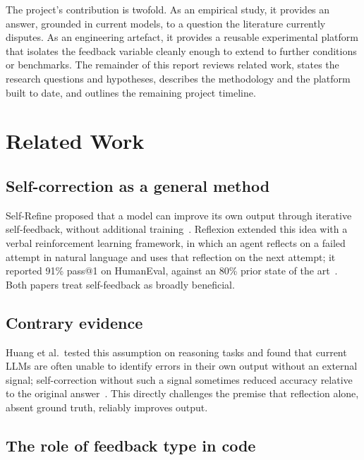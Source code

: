 \documentclass[conference]{IEEEtran}
\begin{document}
The project's contribution is twofold. As an empirical study, it provides an answer, grounded in current models, to a question the literature currently disputes. As an engineering artefact, it provides a reusable experimental platform that isolates the feedback variable cleanly enough to extend to further conditions or benchmarks. The remainder of this report reviews related work, states the research questions and hypotheses, describes the methodology and the platform built to date, and outlines the remaining project timeline.

\section{Related Work}

\subsection{Self-correction as a general method}

Self-Refine proposed that a model can improve its own output through iterative self-feedback, without additional training~\cite{madaan2023}. Reflexion extended this idea with a verbal reinforcement learning framework, in which an agent reflects on a failed attempt in natural language and uses that reflection on the next attempt; it reported 91\% pass@1 on HumanEval, against an 80\% prior state of the art~\cite{shinn2023}. Both papers treat self-feedback as broadly beneficial.

\subsection{Contrary evidence}

Huang et al.\ tested this assumption on reasoning tasks and found that current LLMs are often unable to identify errors in their own output without an external signal; self-correction without such a signal sometimes reduced accuracy relative to the original answer~\cite{huang2024}. This directly challenges the premise that reflection alone, absent ground truth, reliably improves output.

\subsection{The role of feedback type in code}
\end{document}
